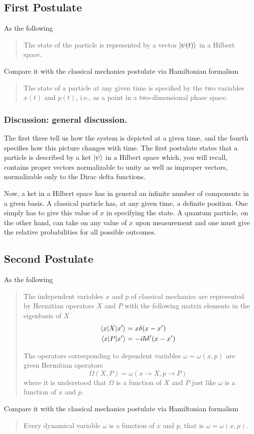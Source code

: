 \documentclass[../../../main.tex]{subfiles}
\begin{document}
\subsection{First Postulate}
As the following
\begin{quotation}
    The state of the particle is represented by a vector $\ket{\psi(t)}$ in a Hilbert space.
\end{quotation}
Compare it with the classical mechanics postulate via Hamiltonian formalism
\begin{quotation}
    The state of a particle at any given time is specified by the two variables $x(t)$ and $p(t)$, i.e., as a point in a two-dimensional phase space.
\end{quotation}

\subsubsection{Discussion: general discussion.}
The first three tell us how the system is depicted at a given time, and the fourth specifies how this picture changes with time.
The first postulate states that a particle is described by a ket $\ket{\psi} $ in a Hilbert space which, you will recall, contains proper vectors normalizable to unity as well as improper vectors, normalizable only to the Dirac delta functions.

Now, a ket in a Hilbert space has in general an infinite number of components in a given basis. 
A classical particle has, at any given time, a definite position. 
One simply has to give this value of $x$ in specifying the state. 
A quantum particle, on the other hand, can take on any value of $x$ upon measurement and one must give the relative probabilities for all possible outcomes.

\subsection{Second Postulate}
As the following
\begin{quotation}
    The independent variables $x$ and $p$ of classical mechanics are represented by Hermitian operators $X$ and $P$ with the following matrix elements in the eigenbasis of $X$
    \begin{align*}
        \braket{x|X|x'}&=x\delta(x-x')\\
        \braket{x|P|x'}&=-i\hbar \delta'(x-x')
    \end{align*}

    The operators corresponding to dependent variables $\omega=\omega(x,p)$ are given Hermitian operators
    \begin{equation*}
        \Omega(X,P)=\omega \left( x\rightarrow X, p\rightarrow P \right) 
    \end{equation*}
    where it is understood that $\Omega$ is a function of $X$ and $P$ just like $\omega$ is a function of $x$ and $p$.
\end{quotation}
Compare it with the classical mechanics postulate via Hamiltonian formalism
\begin{quotation}
    Every dynamical variable $\omega$ is a function of $x$ and $p$, that is $\omega=\omega(x,p)$.
\end{quotation}
\end{document}
